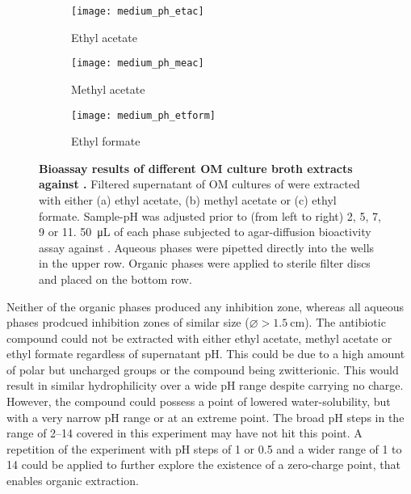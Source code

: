 \begin{figure}[htbp]
	\centering
	\begin{subfigure}{\textwidth}
		\captionsetup{singlelinecheck = false, format= hang, justification=raggedright, font=footnotesize, labelsep=space}
		\centering
		\texttt{[image: medium\_ph\_etac]}
		\caption{Ethyl acetate}
	\end{subfigure}
	\begin{subfigure}{\textwidth}
		\centering
		\texttt{[image: medium\_ph\_meac]}
		\caption{Methyl acetate}
	\end{subfigure}
	\begin{subfigure}{\textwidth}
		\centering
		\texttt{[image: medium\_ph\_etform]}
		\caption{Ethyl formate}
	\end{subfigure}
	\caption[Bioassay results of different OM culture broth extracts against \coli]{%
		\textbf{Bioassay results of different OM culture broth extracts against \coli{}.}
		Filtered supernatant of OM cultures of \tue were extracted with either (a) ethyl acetate, (b) methyl acetate or (c) ethyl formate.
    	Sample-pH was adjusted prior to (from left to right) 2, 5, 7, 9 or 11.
    	\SI{50}{\micro\liter} of each phase subjected to agar-diffusion bioactivity assay against \coli{}.
    	Aqueous phases were pipetted directly into the wells in the upper row.
    	Organic phases were applied to sterile filter discs and placed on the bottom row.
    }
	\label{fig:results_extraction_bioassay}
\end{figure}

Neither of the organic phases produced any inhibition zone, whereas all aqueous phases prodcued inhibition zones of similar size ($\varnothing > \SI{1.5}{\centi\meter}$).
The antibiotic compound could not be extracted with either ethyl acetate, methyl acetate or ethyl formate regardless of supernatant pH.
This could be due to a high amount of polar but uncharged groups or the compound being zwitterionic.
This would result in similar hydrophilicity over a wide pH range despite carrying no charge.
However, the compound could possess a point of lowered water-solubility, but with a very narrow pH range or at an extreme point.
The broad pH steps in the range of 2--14 covered in this experiment may have not hit this point.
A repetition of the experiment with pH steps of 1 or 0.5 and a wider range of 1 to 14 could be applied to further explore the existence of a zero-charge point, that enables organic extraction.


